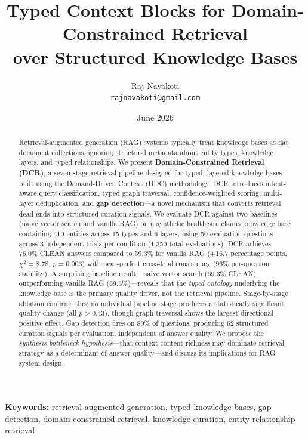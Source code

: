 \documentclass[11pt,a4paper]{article}
\title{\textbf{Typed Context Blocks for Domain-Constrained Retrieval\\over Structured Knowledge Bases}}
\author{
  Raj Navakoti \\
  \texttt{rajnavakoti@gmail.com}
}
\date{June 2026}
\begin{document}
\maketitle

\begin{abstract}
Retrieval-augmented generation (RAG) systems typically treat knowledge bases as flat document collections, ignoring structural metadata about entity types, knowledge layers, and typed relationships. We present \textbf{Domain-Constrained Retrieval (DCR)}, a seven-stage retrieval pipeline designed for typed, layered knowledge bases built using the Demand-Driven Context (DDC) methodology. DCR introduces intent-aware query classification, typed graph traversal, confidence-weighted scoring, multi-layer deduplication, and \textbf{gap detection}---a novel mechanism that converts retrieval dead-ends into structured curation signals. We evaluate DCR against two baselines (naive vector search and vanilla RAG) on a synthetic healthcare claims knowledge base containing 410 entities across 15 types and 6 layers, using 50 evaluation questions across 3 independent trials per condition (1,350 total evaluations). DCR achieves 76.0\% CLEAN answers compared to 59.3\% for vanilla RAG (+16.7 percentage points, $\chi^2 = 8.78$, $p = 0.003$) with near-perfect cross-trial consistency (96\% per-question stability). A surprising baseline result---naive vector search (69.3\% CLEAN) outperforming vanilla RAG (59.3\%)---reveals that the \emph{typed ontology} underlying the knowledge base is the primary quality driver, not the retrieval pipeline. Stage-by-stage ablation confirms this: no individual pipeline stage produces a statistically significant quality change (all $p > 0.43$), though graph traversal shows the largest directional positive effect. Gap detection fires on 80\% of questions, producing 62 structured curation signals per evaluation, independent of answer quality. We propose the \emph{synthesis bottleneck hypothesis}---that context content richness may dominate retrieval strategy as a determinant of answer quality---and discuss its implications for RAG system design.
\end{abstract}

\noindent\textbf{Keywords:} retrieval-augmented generation, typed knowledge bases, gap detection, domain-constrained retrieval, knowledge curation, entity-relationship retrieval
\end{document}
